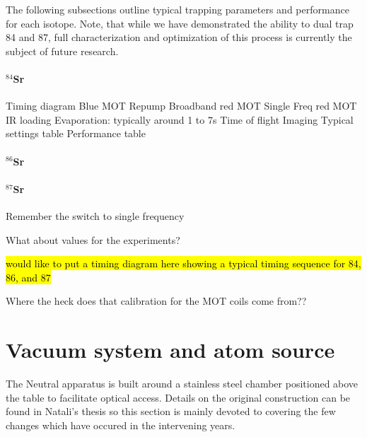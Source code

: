 The following subsections outline typical trapping parameters and performance for each isotope. Note, that while we have demonstrated the ability to dual trap 84 and 87, full characterization and optimization of this process is currently the subject of future research.

\paragraph{$^{84}$Sr} \label{sec:84_trapping}

Timing diagram
	Blue MOT
	Repump
	Broadband red MOT
	Single Freq red MOT
	IR loading
	Evaporation: typically around 1 to 7s
	Time of flight
	Imaging
Typical settings table
Performance table

\paragraph{$^{86}$Sr} \label{sec:86_trapping}

\paragraph{$^{87}$Sr} \label{sec:87_trapping}


Remember the switch to single frequency

What about values for the experiments?

\hl{would like to put a timing diagram here showing a typical timing sequence for 84, 86, and 87}

Where the heck does that calibration for the MOT coils come from??



\section{Vacuum system and atom source} \label{sec:vac}
	
The Neutral apparatus is built around a stainless steel chamber positioned above the table to facilitate optical access. 
Details on the original construction can be found in Natali's thesis so this section is mainly devoted to covering the few changes which have occured in the intervening years.

